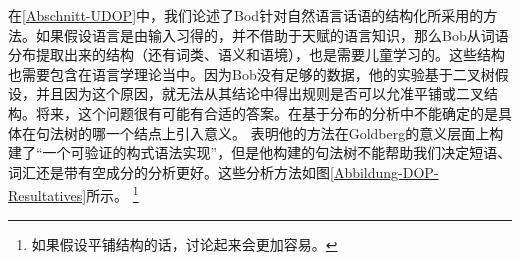 \begin{exe}
\begin{xlist}[iv.]
\begin{exe}
\begin{xlist}[iv.]
在\ref{Abschnitt-UDOP}中，我们论述了Bod\citeyearpar{Bod2009a}针对自然语言话语的结构化所采用的方法。如果假设语言是由输入习得的，并不借助于天赋的语言知识，那么Bob从词语分布提取出来的结构（还有词类、语义和语境），也是需要儿童学习的。这些结构也需要包含在语言学理论当中。因为Bob没有足够的数据，他的实验基于二叉树假设，并且因为这个原因，就无法从其结论中得出规则是否可以允准平铺或二叉结构。将来，这个问题很有可能有合适的答案。在基于分布的分析中不能确定的是具体在句法树的哪一个结点上引入意义。 \citet[]{Bod2009b}表明他的方法在Goldberg的意义层面上构建了“一个可验证的构式语法实现”，但是他构建的句法树不能帮助我们决定短语、词汇还是带有空成分的分析更好。这些分析方法如图\vref{Abbildung-DOP-Resultatives}所示。
\footnote{%
如果假设平铺结构的话，讨论起来会更加容易。

}
\end{xlist}
\end{exe}
\end{xlist}
\end{exe}
